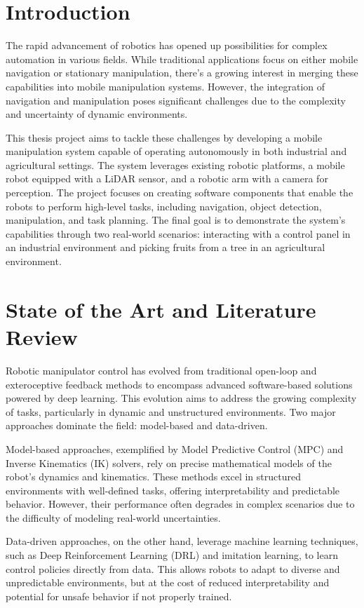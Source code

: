 
\section{Introduction}

The rapid advancement of robotics has opened up possibilities for complex automation in various fields. 
While traditional applications focus on either mobile navigation or stationary manipulation, 
there's a growing interest in merging these capabilities into mobile manipulation systems. 
However, the integration of navigation and manipulation poses significant challenges due to the complexity
and uncertainty of dynamic environments.

This thesis project aims to tackle these challenges by developing a mobile manipulation system capable of 
operating autonomously in both industrial and agricultural settings. The system leverages existing robotic platforms,
a mobile robot equipped with a LiDAR sensor, and a robotic arm with a camera for perception. The project focuses 
on creating software components that enable the robots to perform high-level tasks, including navigation, object detection, 
manipulation, and task planning. The final goal is to demonstrate the system's capabilities through two real-world 
scenarios: interacting with a control panel in an industrial environment and picking fruits from a tree in an 
agricultural environment.

\section{State of the Art and Literature Review}

Robotic manipulator control has evolved from traditional open-loop and exteroceptive feedback methods to encompass
advanced software-based solutions powered by deep learning. This evolution aims to address the growing complexity of tasks,
particularly in dynamic and unstructured environments. Two major approaches dominate the field: model-based and data-driven.

Model-based approaches, exemplified by Model Predictive Control (MPC) and Inverse Kinematics (IK) solvers, rely on precise 
mathematical models of the robot's dynamics and kinematics. These methods excel in structured environments with well-defined 
tasks, offering interpretability and predictable behavior. However, their performance often degrades in complex scenarios
due to the difficulty of modeling real-world uncertainties.

Data-driven approaches, on the other hand, leverage machine learning techniques, such as Deep Reinforcement Learning (DRL)
and imitation learning, to learn control policies directly from data. This allows robots to adapt to diverse and 
unpredictable environments, but at the cost of reduced interpretability and potential for unsafe behavior if not properly trained.

